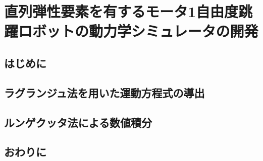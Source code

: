 \chapter[直列弾性要素を有するモータ1自由度跳躍ロボットの動力学シミュレータの開発]%
        {直列弾性要素を有するモータ1自由度跳躍ロボットの動力学シミュレータの開発}

    \section{はじめに}
    \section{ラグランジュ法を用いた運動方程式の導出}
    \section{ルンゲクッタ法による数値積分}
    \section{おわりに}